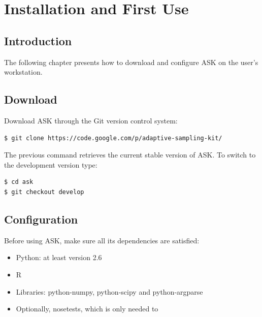 \chapter{Installation and First Use}
\section{Introduction}

The following chapter presents how to download and configure ASK on the user's workstation.

\section{Download}

Download ASK through the Git version control system:

\begin{verbatim}
$ git clone https://code.google.com/p/adaptive-sampling-kit/
\end{verbatim}

The previous command retrieves the current stable version of ASK. To switch to the development version type:

\begin{verbatim}
$ cd ask
$ git checkout develop
\end{verbatim}

\section{Configuration}

Before using ASK, make sure all its dependencies are satisfied:

\begin{itemize}
	\item Python: at least version 2.6
\end{itemize}

\begin{itemize}
	\item R
\end{itemize}

\begin{itemize}
	\item Libraries: python-numpy, python-scipy and python-argparse
\end{itemize}

\begin{itemize}
	\item Optionally, nosetests, which is only needed to 
\end{itemize}

